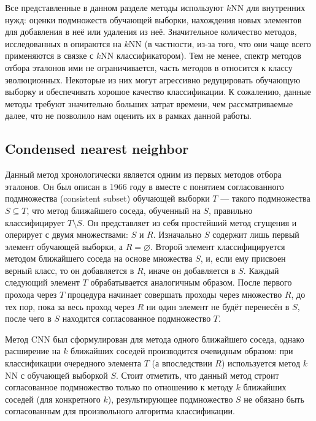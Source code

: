 Все представленные в данном разделе методы используют \(k\)NN для внутренних нужд: оценки подмножеств обучающей выборки, нахождения новых элементов для добавления в неё или удаления из неё. Значительное количество методов, исследованных в \cite{ps-taxonomy} опираются на \(k\)NN (в частности, из-за того, что они чаще всего применяются в связке с \(k\)NN классификатором). Тем не менее, спектр методов отбора эталонов ими не ограничивается, часть методов в \cite{ps-taxonomy} относится к классу эволюционных. Некоторые из них могут агрессивно редуцировать обучающую выборку и обеспечивать хорошое качество классификации. К сожалению, данные методы требуют значительно больших затрат времени, чем рассматриваемые далее, что не позволило нам оценить их в рамках данной работы.

\subsection{Condensed nearest neighbor}
Данный метод хронологически является одним из первых методов отбора эталонов. Он был описан в 1966 году в \cite{hart} вместе с понятием согласованного подмножества (consistent subset) обучающей выборки \(T\) --- такого подмножества \(S\subseteq T\), что метод ближайшего соседа, обученный на \(S\), правильно классифицирует \(T\setminus S\). Он представляет из себя простейший метод сгущения и оперирует с двумя множествами: \(S\) и \(R\). Изначально \(S\) содержит лишь первый элемент обучающей выборки, а \(R=\varnothing\). Второй элемент классифицируется методом ближайшего соседа на основе множества \(S\), и, если ему присвоен верный класс, то он добавляется в \(R\), иначе он добавляется в \(S\). Каждый следующий элемент \(T\) обрабатывается аналогичным образом. После первого прохода через \(T\) процедура начинает совершать проходы через множество \(R\), до тех пор, пока за весь проход через \(R\) ни один элемент не будёт перенесён в \(S\), после чего в \(S\) находится согласованное подмножество \(T\).

Метод CNN был сформулирован для метода одного ближайшего соседа, однако расширение на \(k\) ближайших соседей производится очевидным образом: при классификации очередного элемента \(T\) (а впоследствии \(R\)) используется метод \(k\)NN с обучающей выборкой \(S\). Стоит отметить, что данный метод строит согласованное подмножество только по отношению к методу \(k\) ближайших соседей (для конкретного \(k\)), результирующее подмножество \(S\) не обязано быть согласованным для произвольного алгоритма классификации.

